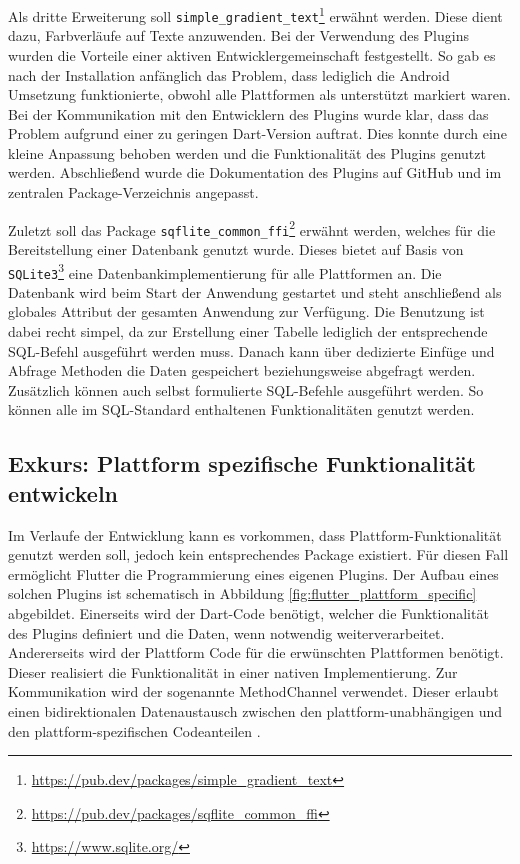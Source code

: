 Als dritte Erweiterung soll \verb|simple_gradient_text|\footnote{\url{https://pub.dev/packages/simple\_gradient\_text}} erwähnt werden. Diese dient dazu, Farbverläufe auf Texte anzuwenden. Bei der Verwendung des Plugins wurden die Vorteile einer aktiven Entwicklergemeinschaft festgestellt. So gab es nach der Installation anfänglich das Problem, dass lediglich die Android Umsetzung funktionierte, obwohl alle Plattformen als unterstützt markiert waren. Bei der Kommunikation mit den Entwicklern des Plugins wurde klar, dass das Problem aufgrund einer zu geringen Dart-Version auftrat. Dies konnte durch eine kleine Anpassung behoben werden und die Funktionalität des Plugins genutzt werden. Abschließend wurde die Dokumentation des Plugins auf GitHub und im zentralen Package-Verzeichnis angepasst.

Zuletzt soll das Package \verb|sqflite_common_ffi|\footnote{\url{https://pub.dev/packages/sqflite\_common\_ffi}} erwähnt werden, welches für die Bereitstellung einer Datenbank genutzt wurde. Dieses bietet auf Basis von \verb|SQLite3|\footnote{\url{https://www.sqlite.org/}} eine Datenbankimplementierung für alle Plattformen an.
Die Datenbank wird beim Start der Anwendung gestartet und steht anschließend als globales Attribut der gesamten Anwendung zur Verfügung.
Die Benutzung ist dabei recht simpel, da zur Erstellung einer Tabelle lediglich der entsprechende SQL-Befehl ausgeführt werden muss.
Danach kann über dedizierte Einfüge und Abfrage Methoden die Daten gespeichert beziehungsweise abgefragt werden.
Zusätzlich können auch selbst formulierte SQL-Befehle ausgeführt werden. So können alle im SQL-Standard enthaltenen Funktionalitäten genutzt werden.


\subsection{Exkurs: Plattform spezifische Funktionalität entwickeln}
Im Verlaufe der Entwicklung kann es vorkommen, dass Plattform-Funktionalität genutzt werden soll, jedoch kein entsprechendes Package existiert.
Für diesen Fall ermöglicht Flutter die Programmierung eines eigenen Plugins.
Der Aufbau eines solchen Plugins ist schematisch in Abbildung \ref{fig:flutter_plattform_specific} abgebildet. 
Einerseits wird der Dart-Code benötigt, welcher die Funktionalität des Plugins definiert und die Daten, wenn notwendig weiterverarbeitet. 
Andererseits wird der Plattform Code für die erwünschten Plattformen benötigt. Dieser realisiert die Funktionalität in einer nativen Implementierung.
Zur Kommunikation wird der sogenannte MethodChannel verwendet. Dieser erlaubt einen bidirektionalen Datenaustausch zwischen den plattform-unabhängigen und den plattform-spezifischen Codeanteilen \cite[Kapitel~12.3]{Flutter_Recipes}.

